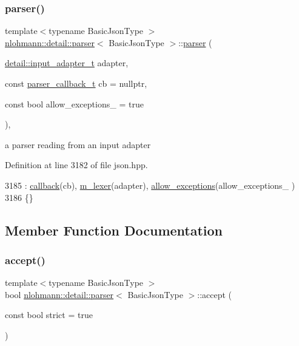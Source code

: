 \subsubsection{\texorpdfstring{parser()}{parser()}}
{\footnotesize\ttfamily template$<$typename Basic\+Json\+Type $>$ \\
\hyperlink{classnlohmann_1_1detail_1_1parser}{nlohmann\+::detail\+::parser}$<$ Basic\+Json\+Type $>$\+::\hyperlink{classnlohmann_1_1detail_1_1parser}{parser} (\begin{DoxyParamCaption}\item[{\hyperlink{namespacenlohmann_1_1detail_ae132f8cd5bb24c5e9b40ad0eafedf1c2}{detail\+::input\+\_\+adapter\+\_\+t}}]{adapter,  }\item[{const \hyperlink{classnlohmann_1_1detail_1_1parser_ad250ad4f2b4af4a497e727c963162ff1}{parser\+\_\+callback\+\_\+t}}]{cb = {\ttfamily nullptr},  }\item[{const bool}]{allow\+\_\+exceptions\+\_\+ = {\ttfamily true} }\end{DoxyParamCaption})\hspace{0.3cm}{\ttfamily [inline]}, {\ttfamily [explicit]}}



a parser reading from an input adapter 



Definition at line 3182 of file json.\+hpp.


\begin{DoxyCode}
3185         : \hyperlink{classnlohmann_1_1detail_1_1parser_a7600d272ec605e3ffdc8512b3585f476}{callback}(cb), \hyperlink{classnlohmann_1_1detail_1_1parser_a22dcc815551a4052b87797b34171b352}{m\_lexer}(adapter), \hyperlink{classnlohmann_1_1detail_1_1parser_a3de1ea054cfa606e79fa07741f081b5f}{allow\_exceptions}(allow\_exceptions\_
      )
3186     \{\}
\end{DoxyCode}


\subsection{Member Function Documentation}
\mbox{\label{classnlohmann_1_1detail_1_1parser_a20997b42262856935b60fc91bf05bf3f}} 
\subsubsection{\texorpdfstring{accept()}{accept()}}
{\footnotesize\ttfamily template$<$typename Basic\+Json\+Type $>$ \\
bool \hyperlink{classnlohmann_1_1detail_1_1parser}{nlohmann\+::detail\+::parser}$<$ Basic\+Json\+Type $>$\+::accept (\begin{DoxyParamCaption}\item[{const bool}]{strict = {\ttfamily true} }\end{DoxyParamCaption})\hspace{0.3cm}{\ttfamily [inline]}}



